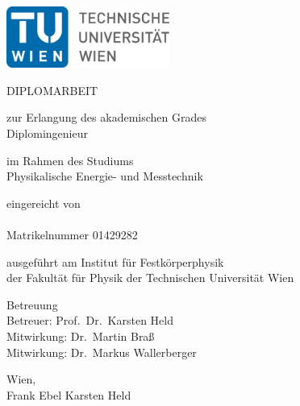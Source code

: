 
\begin{titlepage}
    \includegraphics[width=0.4\textwidth]{graphics/figures/logo_tu.pdf}
    \begin{center}
        \vspace{1.5cm}

        {\large DIPLOMARBEIT}

        \vspace{1em}

        {\Huge \textbf{\@title}}

        \vspace{2em}

        \begin{large}
            zur Erlangung des akademischen Grades\\
            Diplomingenieur

            \vspace{1em}

            im Rahmen des Studiums\\
            Physikalische Energie- und Messtechnik

            \vspace{1em}

            eingereicht von\\
            \@author\\
            Matrikelnummer 01429282\\
        \end{large}
    \end{center}

    \vspace{4em}

    \noindent ausgeführt am Institut für Festkörperphysik\\
    der Fakultät für Physik der Technischen Universität Wien

    \vspace{1em}

    \noindent Betreuung\\
    Betreuer: Prof.\ Dr.\ Karsten Held\\
    Mitwirkung: Dr.\ Martin Braß\\
    Mitwirkung: Dr.\ Markus Wallerberger

    \vspace{5em}

    \noindent Wien, \@date \hspace{4em} \makebox[4cm]{\hrulefill} \hspace{4em} \makebox[4cm]{\hrulefill}\\
    \vphantom{a} \hspace{11.5em} Frank Ebel \hspace{8.8em} Karsten Held
\end{titlepage}
